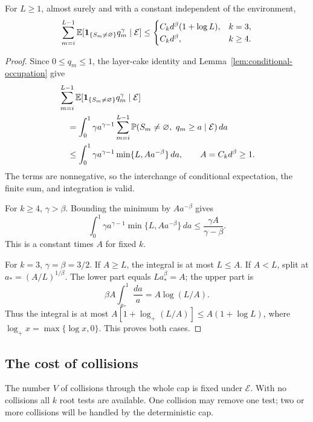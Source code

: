\begin{lemma}\label{lem:integrated-occupation}
For \(L\ge1\), almost surely and with a constant independent of the
environment,
\begin{equation}\label{eq:integrated-occupation}
 \sum_{m=i}^{L-1}
 \mathbb E[\mathbf1_{\{S_m\ne\varnothing\}}q_m^\gamma\mid\mathcal E]
 \le
 \begin{cases}
 C_kd^\beta(1+\log L),&k=3,\\
 C_kd^\beta,&k\ge4.
 \end{cases}
\end{equation}
\end{lemma}

\begin{proof}
Since \(0\le q_m\le1\), the layer-cake identity and
Lemma~\ref{lem:conditional-occupation} give
\begin{align}
 &\sum_{m=i}^{L-1}
 \mathbb E[\mathbf1_{\{S_m\ne\varnothing\}}q_m^\gamma\mid\mathcal E]
 \notag\\
 &\quad=\int_0^1\gamma a^{\gamma-1}
       \sum_{m=i}^{L-1}
       \mathbb P(S_m\ne\varnothing,\ q_m\ge a\mid\mathcal E)\,da
 \notag\\
 &\quad\le\int_0^1\gamma a^{\gamma-1}
        \min\{L,Aa^{-\beta}\}\,da,\qquad
 A=C_kd^\beta\ge1.
 \label{eq:occupation-integral}
\end{align}
The terms are nonnegative, so the interchange of conditional
expectation, the finite sum, and integration is valid.

For \(k\ge4\), \(\gamma>\beta\).  Bounding the minimum by
\(Aa^{-\beta}\) gives
\[
 \int_0^1\gamma a^{\gamma-1}\min\{L,Aa^{-\beta}\}\,da
 \le\frac{\gamma A}{\gamma-\beta}.
\]
This is a constant times \(A\) for fixed \(k\).

For \(k=3\), \(\gamma=\beta=3/2\).  If \(A\ge L\), the integral is
at most \(L\le A\).  If \(A<L\), split at
\(a_*=(A/L)^{1/\beta}\).  The lower part equals \(La_*^\beta=A\);
the upper part is
\[
 \beta A\int_{a_*}^{1}\frac{da}{a}=A\log(L/A).
\]
Thus the integral is at most
\(A[1+\log_+(L/A)]\le A(1+\log L)\), where
\(\log_+x=\max\{\log x,0\}\).  This proves both cases.
\end{proof}

\subsection{The cost of collisions}

The number \(V\) of collisions through the whole cap is fixed under
\(\mathcal E\).  With no collisions all \(k\) root tests are
available.  One collision may remove one test; two or more collisions
will be handled by the deterministic cap.

